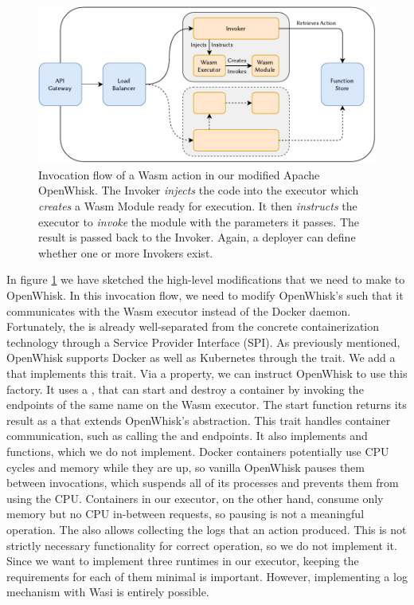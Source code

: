 \begin{figure}
    \includegraphics{figures/WasmOpenWhiskActionInvocationFlow.pdf}
    \caption{Invocation flow of a Wasm action in our modified Apache OpenWhisk. The Invoker \emph{injects} the code into the executor which \emph{creates} a Wasm Module ready for execution. It then \emph{instructs} the executor to \emph{invoke} the module with the parameters it passes. The result is passed back to the Invoker. Again, a deployer can define whether one or more Invokers exist.}
    \label{fig:wasm-openwhisk-action-invocation-flow}
\end{figure}

In figure \ref{fig:wasm-openwhisk-action-invocation-flow} we have sketched the high-level modifications that we need to make to OpenWhisk. In this invocation flow, we need to modify OpenWhisk's  such that it communicates with the Wasm executor instead of the Docker daemon. Fortunately, the  is already well-separated from the concrete containerization technology through a Service Provider Interface (SPI). As previously mentioned, OpenWhisk supports Docker as well as Kubernetes through the  trait. We add a  that implements this trait. Via a property, we can instruct OpenWhisk to use this factory. It uses a , that can start and destroy a container by invoking the endpoints of the same name on the Wasm executor. The start function returns its result as a  that extends OpenWhisk's  abstraction. This trait handles container communication, such as calling the  and  endpoints. It also implements  and  functions, which we do not implement. Docker containers potentially use CPU cycles and memory while they are up, so vanilla OpenWhisk pauses them between invocations, which suspends all of its processes and prevents them from using the CPU. Containers in our executor, on the other hand, consume only memory but no CPU in-between requests, so pausing is not a meaningful operation. The  also allows collecting the logs that an action produced. This is not strictly necessary functionality for correct operation, so we do not implement it. Since we want to implement three runtimes in our executor, keeping the requirements for each of them minimal is important. However, implementing a log mechanism with Wasi is entirely possible.

